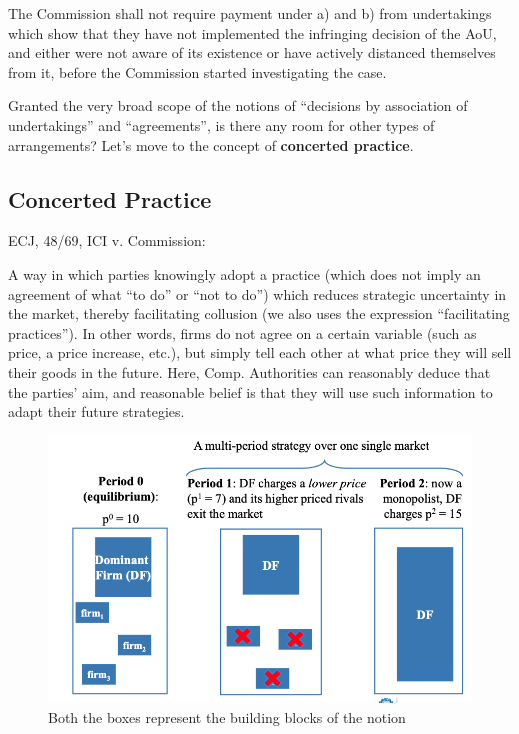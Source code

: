             The Commission shall not require payment under a) and b) from undertakings which show that they have not implemented the infringing decision of the AoU, and either were not aware of its existence or have actively distanced themselves from it, before the Commission started investigating the case.


            Granted the very broad scope of the notions of “decisions by association of undertakings” and “agreements”, is there any room for other types of arrangements? Let's move to the concept of \textbf{concerted practice}.

\newpage

    \subsection{Concerted Practice}

            ECJ, 48/69, ICI v. Commission:


            A way in which parties knowingly adopt a practice (which does not imply an agreement of what “to do” or “not to do”) which reduces strategic uncertainty in the market, thereby facilitating collusion (we also uses the expression “facilitating practices”). In other words, firms do not agree on a certain variable (such as price, a price increase, etc.), but simply tell each other at what price they will sell their goods in the future. Here, Comp. Authorities can reasonably deduce that the parties’ aim, and reasonable belief is that they will use such information to adapt their future strategies.

            \begin{figure}[h]
                \centering
                \includegraphics[width=0.85\linewidth]{graphics/L7-2.png}
                \caption{Both the boxes represent the building blocks of the notion}
            \end{figure}

